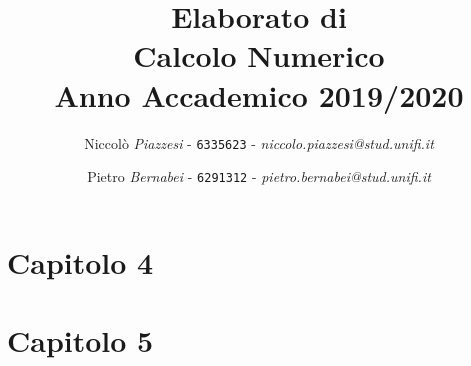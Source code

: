 \documentclass[a4paper]{article}
\date{}
\begin{document}
\title{\vspace{2cm}Elaborato di\\ \textbf{Calcolo Numerico}\\ Anno Accademico 2019/2020\vspace{3cm}}

\author{Niccolò \emph{Piazzesi} - \texttt{6335623} - \textit{niccolo.piazzesi@stud.unifi.it}
   \and Pietro \emph{Bernabei} - \texttt{6291312} - \textit{pietro.bernabei@stud.unifi.it}}


\maketitle
\newpage
\tableofcontents


\newpage






\newpage
\section{\textbf{Capitolo 4}}


\newpage
\section{\textbf{Capitolo 5}}

\newpage
{}
\end{document}
